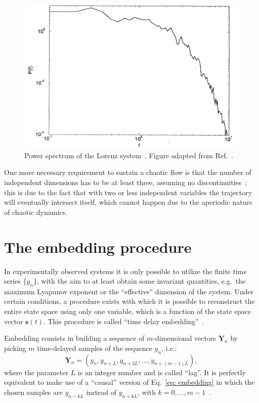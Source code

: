 \begin{figure}[!htbp]
    \centering
    \includegraphics[width=.6\linewidth]{images/lorenz_spectrum.png}
    \caption{
        Power spectrum of the Lorenz system~\cite{lorenz1963deterministic}.
        Figure adapted from Ref.~\cite{ref:abarbanel_fourier_spectra}.
    }\label{fig: lorenz spectrum}
\end{figure}

One more necessary requirement to sustain a chaotic flow is that
the number of independent dimensions has to be at least three, assuming no discontinuities~\cite{ref:chaos_two_dim_theorem};
this is due to the fact that
with two or less independent variables the trajectory will eventually intersect itself, which
cannot happen due to the aperiodic nature of chaotic dynamics.


\section{The embedding procedure}\label{sec: embedding}

In experimentally observed systems it is only possible to utilize the finite time series $\{y_n\}$,
with the aim to at least obtain some invariant quantities, e.g.\ the maximum Lyapunov exponent or
the ``effective'' dimension of the system. Under certain conditions, a procedure exists with which
it is possible to reconstruct the entire state space using only one variable, which is a
function of the state space vector $\mathbf{s}(t)$. This procedure is called ``time delay embedding''~\cite{ref:packard1980geometry}.

Embedding consists in building a sequence of $m$-dimensional vectors $\mathbf{Y}_n$ by picking
$m$ time-delayed samples of the sequence $y_n$, i.e.:
\begin{equation}
    \label{eq: embedding}
    \mathbf{Y}_n=\left(y_n,y_{n+L},y_{n+2L},\ldots,y_{n+(m-1)L}\right),
\end{equation}
where the parameter $L$ is an integer number and is called ``lag''. It is perfectly equivalent to make use of
a ``causal'' version of Eq.~\ref{eq: embedding} in which the chosen samples are $y_{n-kL}$ instead of
$y_{n+kL}$, with $k=0,\ldots,m-1$~\cite{ref:bradley2015nonlinear}.

